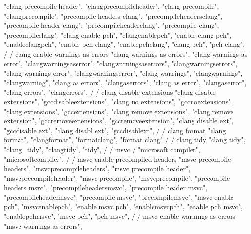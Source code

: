         "clang precompile header",  
        "clangprecompileheader",  
        "clang precompile",  
        "clangprecompile",  
        "precompile headers clang",  
        "precompileheadersclang",  
        "precompile header clang",  
        "precompileheaderclang",  
        "precompile clang",  
        "precompileclang",  
        "clang enable pch",  
        "clangenablepch",  
        "enable clang pch",  
        "enableclangpch",  
        "enable pch clang",  
        "enablepchclang",  
        "clang pch",  
        "pch clang",  
        /
        / clang enable warnings as errors
        "clang warnings as errors", 
        "clang warnings as error", 
        "clangwarningsaserror", 
        "clangwarningsaserrors", 
        "clangwarningserrors", 
        "clang warnings error", 
        "clangwarningserror", 
        "clang warnings", 
        "clangwarnings", 
        "clangwarning", 
        "clang as errors", 
        "clangaserrors", 
        "clang as error", 
        "clangaserror", 
        "clang errors", 
        "clangerrors", 
        /
        / clang disable extensions 
        "clang disable extensions", 
        "gccdisableextensions", 
        "clang no extensions", 
        "gccnoextensions", 
        "clang extensions", 
        "gccextensions", 
        "clang remove extensions", 
        "clang remove extension", 
        "gccremoveextensions", 
        "gccremoveextension", 
        "clang disable ext", 
        "gccdisable ext", 
        "clang disabl ext", 
        "gccdisablext", 
        /
        / clang format 
        "clang format",
        "clangformat",
        "formatclang",
        "format clang"
        /
        / clang tidy 
        "clang tidy",  
        "clang_tidy", "clangtidy", "tidy",  
        /
        / msvc  
        / "microsoft compiler", "microsoftcompiler",  
        /
        / msvc enable precompiled headers 
        "msvc precompile headers",  
        "msvcprecompileheaders",  
        "msvc precompile header",  
        "msvcprecompileheader",  
        "msvc precompile",  
        "msvcprecompile",  
        "precompile headers msvc",  
        "precompileheadersmsvc",  
        "precompile header msvc",  
        "precompileheadermsvc",  
        "precompile msvc",  
        "precompilemsvc",  
        "msvc enable pch",  
        "msvcenablepch",  
        "enable msvc pch",  
        "enablemsvcpch",  
        "enable pch msvc",  
        "enablepchmsvc",  
        "msvc pch",  
        "pch msvc",  
        /
        / msvc enable warnings as errors
        "msvc warnings as errors", 
